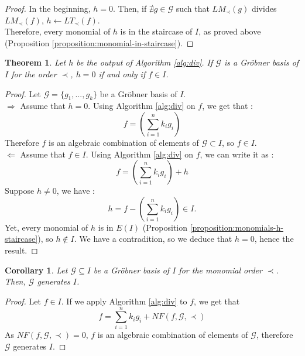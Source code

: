 \documentclass{article}
\newtheorem{theorem}{Theorem}[section]
\newtheorem{corollary}{Corollary}[theorem]
\begin{document}
\begin{proof}
    In the beginning, $h = 0$. Then, if $\nexists g \in \mathscr{G}$ such that $LM_{\prec}(g)$ divides $LM_{\prec}(f)$, $h \gets LT_{\prec}(f)$. \\
    Therefore, every monomial of $h$ is in the staircase of $I$, as proved above (Proposition \ref{proposition:monomial-in-staircase}). 
\end{proof}

\begin{theorem}
    Let $h$ be the output of Algorithm \ref{alg:div}. If $\mathscr{G}$ is a Gröbner basis of $I$ for the order $\prec$, $h = 0$ if and only if $f \in I$.
\end{theorem}

\begin{proof}
    Let $\mathscr{G} = \{g_{1}, ..., g_{k}\}$ be a Gröbner basis of $I$. \\
    $\Rightarrow$ Assume that $h = 0$. Using Algorithm \ref{alg:div} on $f$, we get that : 
    \begin{displaymath}
        f = \left( \sum_{i = 1}^{n} k_{i}g_{i} \right)
    \end{displaymath}
    Therefore $f$ is an algebraic combination of elements of $\mathscr{G} \subset I$, so $f \in I$. \\
    $\Leftarrow$ Assume that $f \in I$. Using Algorithm \ref{alg:div} on $f$, we can write it as :
    \begin{displaymath}
        f = \left( \sum_{i = 1}^{n} k_{i}g_{i} \right) + h
    \end{displaymath}
    Suppose $h \neq 0$, we have : 
    \begin{displaymath}
        h = f - \left( \sum_{i = 1}^{n} k_{i}g_{i} \right) \in I. 
    \end{displaymath}
    Yet, every monomial of $h$ is in $E(I)$ (Proposition \ref{proposition:monomials-h-staircase}), so $h \notin I$. We have a contradition, so we deduce that $h = 0$, hence the result.
\end{proof}

\begin{corollary} \label{corollary:g-generates-i}
    Let $\mathscr{G} \subseteq I$ be a Gröbner basis of $I$ for the monomial order $\prec$. Then, $\mathscr{G}$ generates $I$.
\end{corollary}

\begin{proof}
    Let $f \in I$. If we apply Algorithm \ref{alg:div} to $f$, we get that 
    \begin{displaymath}
        f = \sum_{i = 1}^{n} k_{i}g_{i} + NF(f, \mathscr{G}, \prec)
    \end{displaymath}
    As $NF(f, \mathscr{G}, \prec) = 0$, $f$ is an algebraic combination of elements of $\mathscr{G}$, therefore $\mathscr{G}$ generates $I$.
\end{proof}
\end{document}
